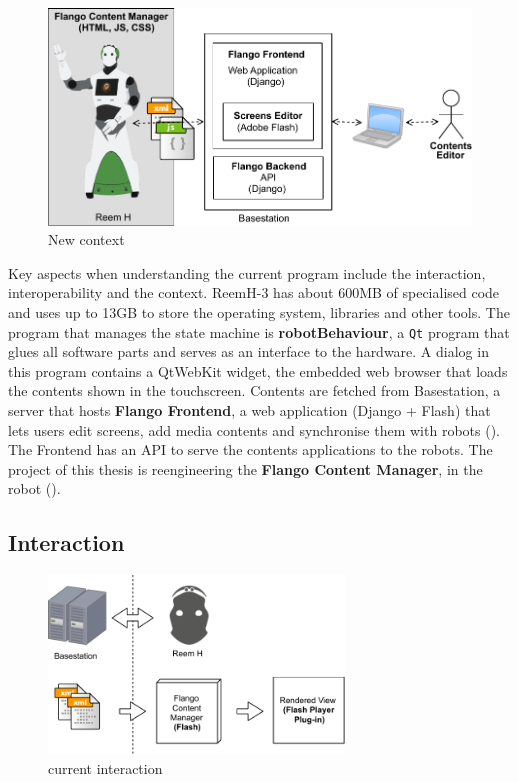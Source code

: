 \begin{figure}[htb]
    \label{fig:context-new}
    \centering
    \includegraphics[width=\textwidth]{figures/context-new}
    \caption{New context}
\end{figure}

Key aspects when understanding the current program include the interaction, interoperability and the context.
ReemH-3 has about 600MB of specialised code and uses up to 13GB to store the operating system, libraries and other tools.
The program that manages the state machine is \textbf{robotBehaviour}, a \texttt{Qt} program that glues all software parts and serves as an interface to the hardware.
A dialog in this program contains a QtWebKit widget, the embedded web browser that loads the contents shown in the touchscreen.
Contents are fetched from Basestation, a server that hosts \textbf{Flango Frontend}, a web application (Django + Flash) that lets users edit screens, add media contents and synchronise them with robots ().
The Frontend has an \ac{API} to serve the contents applications to the robots.
The project of this thesis is reengineering the \textbf{Flango Content Manager}, in the robot ().

\subsection{Interaction}
\begin{figure}[htb]
    \label{fig:interaction-original}
    \centering
    \includegraphics[width=0.7\textwidth]{figures/interaction-original}
    \caption{current interaction}
\end{figure}

